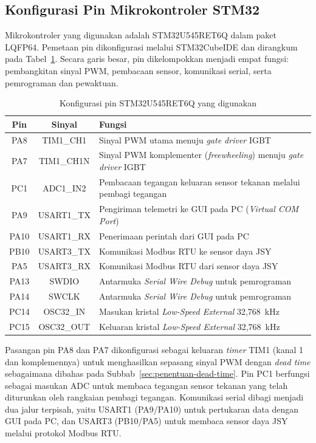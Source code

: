 \subsection{Konfigurasi Pin Mikrokontroler STM32}
\label{sec:konfigurasi-pin-stm32}

Mikrokontroler yang digunakan adalah STM32U545RET6Q dalam paket LQFP64.
Pemetaan pin dikonfigurasi melalui STM32CubeIDE dan dirangkum pada
Tabel~\ref{tab:konfigurasi-pin-stm32}. Secara garis besar, pin dikelompokkan
menjadi empat fungsi: pembangkitan sinyal PWM, pembacaan sensor, komunikasi
serial, serta pemrograman dan pewaktuan.

\begin{table}[H]
\centering
\caption{Konfigurasi pin STM32U545RET6Q yang digunakan}
\label{tab:konfigurasi-pin-stm32}
\begin{tabularx}{\linewidth}{|c|c|>{\raggedright\arraybackslash}X|}
\hline
\textbf{Pin} & \textbf{Sinyal} & \textbf{Fungsi} \\
\hline
PA8  & TIM1\_CH1  & Sinyal PWM utama menuju \emph{gate driver} IGBT \\
\hline
PA7  & TIM1\_CH1N & Sinyal PWM komplementer (\emph{freewheeling}) menuju \emph{gate driver} IGBT \\
\hline
PC1  & ADC1\_IN2  & Pembacaan tegangan keluaran sensor tekanan melalui pembagi tegangan \\
\hline
PA9  & USART1\_TX & Pengiriman telemetri ke GUI pada PC (\emph{Virtual COM Port}) \\
\hline
PA10 & USART1\_RX & Penerimaan perintah dari GUI pada PC \\
\hline
PB10 & USART3\_TX & Komunikasi Modbus RTU ke sensor daya JSY \\
\hline
PA5  & USART3\_RX & Komunikasi Modbus RTU dari sensor daya JSY \\
\hline
PA13 & SWDIO      & Antarmuka \emph{Serial Wire Debug} untuk pemrograman \\
\hline
PA14 & SWCLK      & Antarmuka \emph{Serial Wire Debug} untuk pemrograman \\
\hline
PC14 & OSC32\_IN  & Masukan kristal \emph{Low-Speed External} 32,768~kHz \\
\hline
PC15 & OSC32\_OUT & Keluaran kristal \emph{Low-Speed External} 32,768~kHz \\
\hline
\end{tabularx}
\end{table}

Pasangan pin PA8 dan PA7 dikonfigurasi sebagai keluaran \emph{timer} TIM1
(kanal 1 dan komplemennya) untuk menghasilkan sepasang sinyal PWM dengan
\emph{dead time} sebagaimana dibahas pada Subbab~\ref{sec:penentuan-dead-time}.
Pin PC1 berfungsi sebagai masukan ADC untuk membaca tegangan sensor tekanan
yang telah diturunkan oleh rangkaian pembagi tegangan. Komunikasi serial
dibagi menjadi dua jalur terpisah, yaitu USART1 (PA9/PA10) untuk pertukaran
data dengan GUI pada PC, dan USART3 (PB10/PA5) untuk membaca sensor daya JSY
melalui protokol Modbus RTU.

